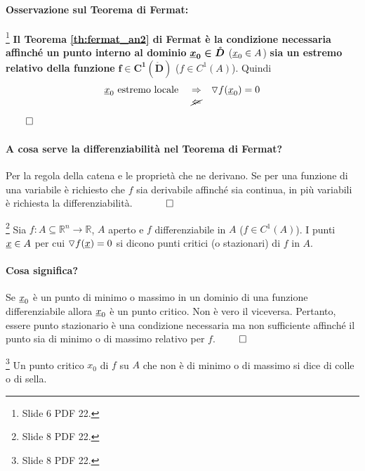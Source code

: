 \paragraph{Osservazione sul Teorema di Fermat:}\footnote{Slide 6 PDF 22.}
\textbf{Il Teorema \ref{th:fermat_an2} di Fermat è la condizione necessaria affinché un punto interno al dominio} $\boldsymbol{\uline x_0\in\mathring D}$ ($\uline x_0\in A$) \textbf{sia un estremo relativo della funzione} $\boldsymbol{f\in C^1(\mathring D)}$ ($f\in C^1(A)$). Quindi
\begin{equation*}
	\begin{matrix}
		\uline x_0 \text{ estremo locale } &\Rightarrow& \triangledown f(\uline x_0)=0\\
		&\cancel{\Leftarrow}&		
	\end{matrix}
\end{equation*}
$\qed$
\paragraph{A cosa serve la differenziabilità nel Teorema di Fermat?}  Per la regola della catena e le proprietà che ne derivano. Se per una funzione di una variabile è richiesto che $f$ sia derivabile affinché sia continua, in più variabili è richiesta la differenziabilità. $\quad\qed$

\begin{definition}\footnote{Slide 8 PDF 22.}
	Sia $f:A\subseteq\mathbb{R}^n\rightarrow\mathbb{R}$, $A$ aperto e $f$ differenziabile in $A$ ($f\in C^1(A)$). I punti $\uline x\in A$ per cui $\triangledown f(\uline x)=0$ si dicono punti critici (o stazionari) di $f$ in $A$.
\end{definition}

\paragraph{Cosa significa?} Se $\uline x_0$ è un punto di minimo o massimo in un dominio di una funzione differenziabile allora $\uline x_0$ è un punto critico. Non è vero il viceversa. Pertanto, essere punto stazionario è una condizione necessaria ma non sufficiente affinché il punto sia di minimo o di massimo relativo per $f$. $\qed$

\begin{definition}\footnote{Slide 8 PDF 22.}
	Un punto critico $x_0$ di $f$ su $A$ che non è di minimo o di massimo si dice di colle o di sella.
\end{definition}

